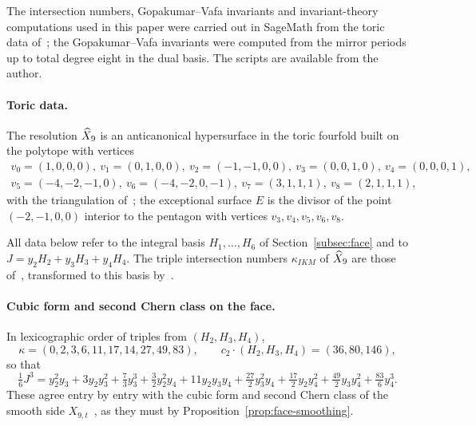 The intersection numbers, Gopakumar--Vafa invariants and invariant-theory computations
used in this paper were carried out in SageMath from the toric data of~\cite{W26quantum}; the
Gopakumar--Vafa invariants were computed from the mirror periods up to total degree eight in the
dual basis. The scripts are available from the author.

\paragraph{Toric data.} The resolution $\widehat X_9$ is an anticanonical hypersurface in the toric
fourfold built on the polytope with vertices
\begin{gather*}
 v_0=(1,0,0,0),\ v_1=(0,1,0,0),\ v_2=(-1,-1,0,0),\ v_3=(0,0,1,0),\ v_4=(0,0,0,1),\\
 v_5=(-4,-2,-1,0),\ v_6=(-4,-2,0,-1),\ v_7=(3,1,1,1),\ v_8=(2,1,1,1),
\end{gather*}
with the triangulation of~\cite[Sect.~3.1]{W26quantum}; the exceptional surface $E$ is the
divisor of the point $(-2,-1,0,0)$ interior to the pentagon with vertices $v_3,v_4,v_5,v_6,v_8$.

All data below refer to the integral basis $H_1,\dots,H_6$ of
Section~\ref{subsec:face} and to $J=y_2H_2+y_3H_3+y_4H_4$. The triple intersection numbers
$\kappa_{IKM}$ of $\widehat X_9$ are those of~\cite[eq.~(B.2)]{W26quantum}, transformed to this basis
by~\cite[eq.~(C.1)]{W26quantum}.

\paragraph{Cubic form and second Chern class on the face.}
In lexicographic order of triples from $(H_2,H_3,H_4)$,
\begin{equation}
 \kappa=(0,2,3,6,11,17,14,27,49,83),\qquad
 c_2\cdot(H_2,H_3,H_4)=(36,80,146),
 \label{eq:app-cubic}
\end{equation}
so that
\begin{equation}
 \tfrac16J^3=y_2^2y_3+3y_2y_3^2+\tfrac73y_3^3+\tfrac32y_2^2y_4
 +11y_2y_3y_4+\tfrac{27}2y_3^2y_4+\tfrac{17}2y_2y_4^2
 +\tfrac{49}2y_3y_4^2+\tfrac{83}6y_4^3 .
 \label{eq:app-volume}
\end{equation}
These agree entry by entry with the cubic form and second Chern class of the smooth side
$X_{9,t}$~\cite[eq.~(5.26)]{W26quantum}, as they must by
Proposition~\ref{prop:face-smoothing}.

